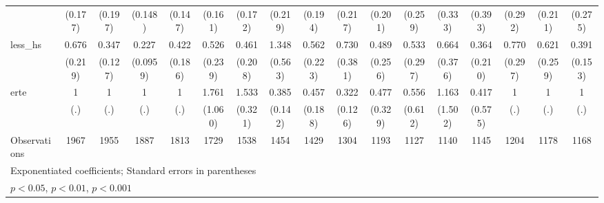 {\begin{tabular}{l*{16}{c}}
                    &     (0.177)         &     (0.197)         &     (0.148)         &     (0.147)         &     (0.161)         &     (0.172)         &     (0.219)         &     (0.194)         &     (0.217)         &     (0.201)         &     (0.259)         &     (0.333)         &     (0.393)         &     (0.292)         &     (0.211)         &     (0.275)         \\
[1em]
less\_hs             &       0.676         &       0.347\sym{**} &       0.227\sym{***}&       0.422\sym{*}  &       0.526         &       0.461         &       1.348         &       0.562         &       0.730         &       0.489         &       0.533         &       0.664         &       0.364         &       0.770         &       0.621         &       0.391\sym{*}  \\
                    &     (0.219)         &     (0.127)         &    (0.0959)         &     (0.186)         &     (0.239)         &     (0.208)         &     (0.563)         &     (0.223)         &     (0.381)         &     (0.256)         &     (0.297)         &     (0.376)         &     (0.210)         &     (0.297)         &     (0.259)         &     (0.153)         \\
[1em]
erte                &           1         &           1         &           1         &           1         &       1.761         &       1.533\sym{*}  &       0.385\sym{**} &       0.457         &       0.322\sym{**} &       0.477         &       0.556         &       1.163         &       0.417         &           1         &           1         &           1         \\
                    &         (.)         &         (.)         &         (.)         &         (.)         &     (1.060)         &     (0.321)         &     (0.142)         &     (0.188)         &     (0.126)         &     (0.329)         &     (0.612)         &     (1.502)         &     (0.575)         &         (.)         &         (.)         &         (.)         \\
\hline
Observations        &        1967         &        1955         &        1887         &        1813         &        1729         &        1538         &        1454         &        1429         &        1304         &        1193         &        1127         &        1140         &        1145         &        1204         &        1178         &        1168         \\
\hline\hline
\multicolumn{17}{l}{\footnotesize Exponentiated coefficients; Standard errors in parentheses}\\
\multicolumn{17}{l}{\footnotesize \sym{*} \(p<0.05\), \sym{**} \(p<0.01\), \sym{***} \(p<0.001\)}\\
\end{tabular}
}
